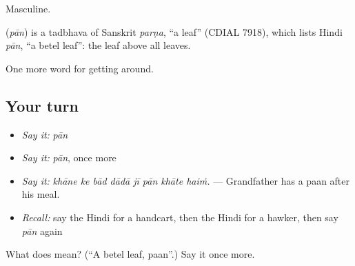 Masculine.

\begin{cousinweb}
\textbf{} (\emph{pān}) is a tadbhava of Sanskrit \emph{parṇa}, \textquotedblleft{}a leaf\textquotedblright{} (CDIAL 7918), which lists Hindi \emph{pān}, \textquotedblleft{}a betel leaf\textquotedblright{}: the leaf above all leaves.
\end{cousinweb}

\begin{grammarlens}[title={What you've built}]
One more word for getting around.
\end{grammarlens}

\subsection*{Your turn}
\begin{itemize}
\raggedright
  \item \emph{Say it:} \emph{pān}
  \item \emph{Say it:} \emph{pān}, once more
  \item \emph{Say it:} \emph{khāne ke bād dādā jī pān khāte haiṁ.} — Grandfather has a paan after his meal.
  \item \emph{Recall:} say the Hindi for a handcart, then the Hindi for a hawker, then say \emph{pān} again
\end{itemize}

\begin{tcolorbox}[breakable,colback=teal!4,colframe=teal!35!black,title={Before you move on}]
What does  mean? (\textquotedblleft{}A betel leaf, paan\textquotedblright{}.) Say it once more.
\end{tcolorbox}
